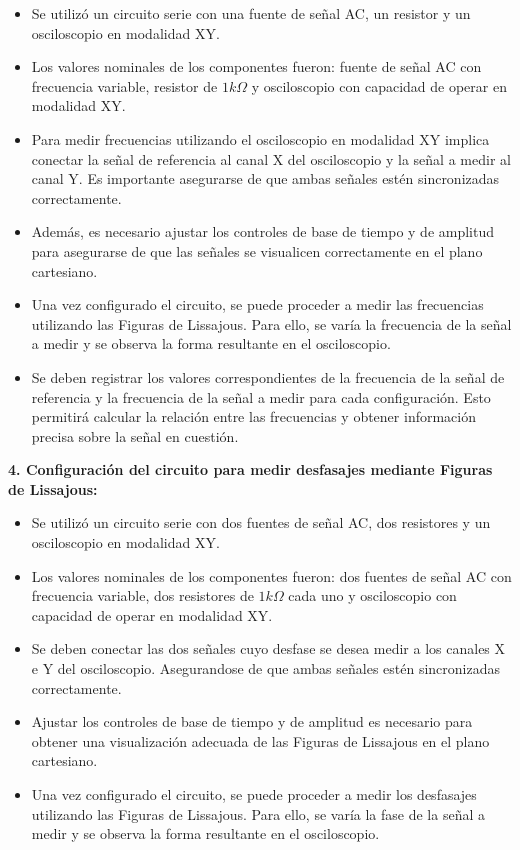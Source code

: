 \documentclass[12pt]{article}
\begin{document}
	\begin{itemize}
		\item Se utilizó un circuito serie con una fuente de señal AC, un resistor y un osciloscopio en modalidad XY.
		\item Los valores nominales de los componentes fueron: fuente de señal AC con frecuencia variable, resistor de $1k\Omega$ y osciloscopio con capacidad de operar en modalidad XY.
		\item Para medir frecuencias utilizando el osciloscopio en modalidad XY implica conectar la señal de referencia al canal X del osciloscopio y la señal a medir al canal Y. Es importante asegurarse de que ambas señales estén sincronizadas correctamente.
		\item Además, es necesario ajustar los controles de base de tiempo y de amplitud para asegurarse de que las señales se visualicen correctamente en el plano cartesiano.	
		\item Una vez configurado el circuito, se puede proceder a medir las frecuencias utilizando las Figuras de Lissajous. Para ello, se varía la frecuencia de la señal a medir y se observa la forma resultante en el osciloscopio.
		\item Se deben registrar los valores correspondientes de la frecuencia de la señal de referencia y la frecuencia de la señal a medir para cada configuración. Esto permitirá calcular la relación entre las frecuencias y obtener información precisa sobre la señal en cuestión.
	\end{itemize}
	
	\textbf{4. Configuración del circuito para medir desfasajes mediante Figuras de Lissajous:}
	
	\begin{itemize}
		\item Se utilizó un circuito serie con dos fuentes de señal AC, dos resistores y un osciloscopio en modalidad XY.
		\item Los valores nominales de los componentes fueron: dos fuentes de señal AC con frecuencia variable, dos resistores de $1k\Omega$ cada uno y osciloscopio con capacidad de operar en modalidad XY.
		\item Se deben conectar las dos señales cuyo desfase se desea medir a los canales X e Y del osciloscopio. Asegurandose de que ambas señales estén sincronizadas correctamente.
		\item Ajustar los controles de base de tiempo y de amplitud es necesario para obtener una visualización adecuada de las Figuras de Lissajous en el plano cartesiano.
		\item Una vez configurado el circuito, se puede proceder a medir los desfasajes utilizando las Figuras de Lissajous. Para ello, se varía la fase de la señal a medir y se observa la forma resultante en el osciloscopio.
	\end{itemize}
	
\end{document}
